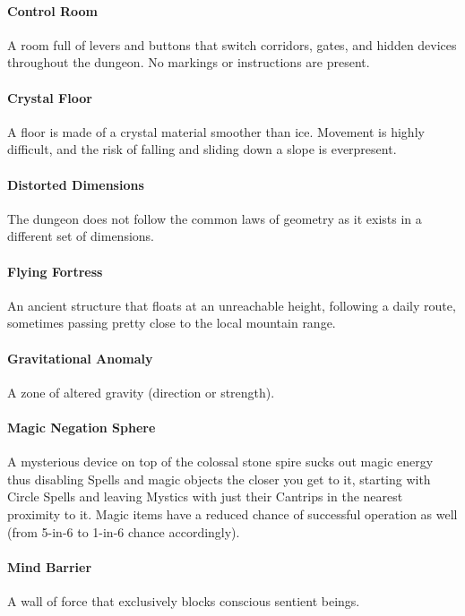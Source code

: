 \documentclass[itdr/core]{subfiles}
\begin{document}
\paragraph{Control Room}
A room full of levers and buttons that switch corridors, gates, and hidden devices throughout the dungeon. No markings or instructions are present.

\vfill
\paragraph{Crystal Floor}
A floor is made of a crystal material smoother than ice. Movement is highly difficult, and the risk of falling and sliding down a slope is everpresent.

\vfill
\paragraph{Distorted Dimensions}
The dungeon does not follow the common laws of geometry as it exists in a different set of dimensions.

\vfill
\paragraph{Flying Fortress}
An ancient structure that floats at an unreachable height, following a daily route, sometimes passing pretty close to the local mountain range.

\vfill
\paragraph{Gravitational Anomaly}
A zone of altered gravity (direction or strength).

\vfill
\paragraph{Magic Negation Sphere}
A mysterious device on top of the colossal stone spire sucks out magic energy thus disabling Spells and magic objects the closer you get to it, starting with  Circle Spells and leaving Mystics with just their Cantrips in the nearest proximity to it. Magic items have a reduced chance of successful operation as well (from 5-in-6 to 1-in-6 chance accordingly).

\vfill
\paragraph{Mind Barrier}
A wall of force that exclusively blocks conscious sentient beings.
\end{document}
